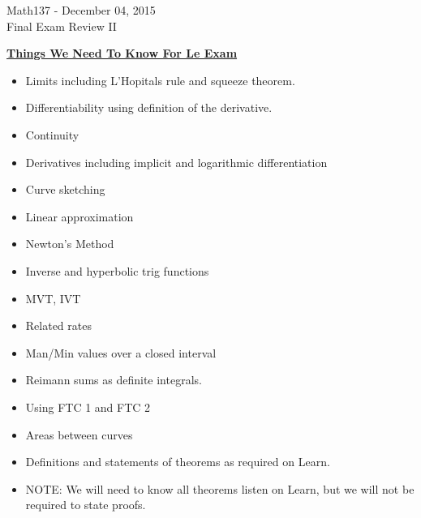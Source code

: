 \documentclass{letter}
\begin{document}
	\begin{center}
		\LARGE Math137 - December 04, 2015\\
		\large Final Exam Review II
	\end{center}
	\vspace{0.25 in}
	
	\underline{\textbf{Things We Need To Know For Le Exam}}\\
	
	\begin{itemize}
		\item Limits including L'Hopitals rule and squeeze theorem.
		\item Differentiability using definition of the derivative.
		\item Continuity
		\item Derivatives including implicit and logarithmic differentiation
		\item Curve sketching
		\item Linear approximation
		\item Newton's Method
		\item Inverse and hyperbolic trig functions
		\item MVT, IVT
		\item Related rates
		\item Man/Min values over a closed interval
		\item Reimann sums as definite integrals.
		\item Using FTC 1 and FTC 2
		\item Areas between curves
		\item Definitions and statements of theorems as required on Learn.
		\item NOTE: We will need to know all theorems listen on Learn, but we will not be required to state proofs.
	\end{itemize}
\end{document}
